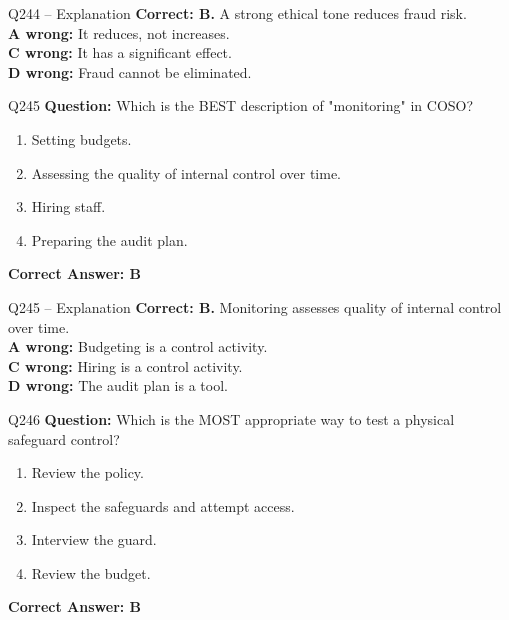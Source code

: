 \documentclass[aspectratio=169,10pt]{beamer}
\begin{document}
	\begin{frame}[t]{Q244 -- Explanation}
		\small
		\textbf{Correct: B.} A strong ethical tone reduces fraud risk. \\[4pt]
		\textbf{A wrong:} It reduces, not increases. \\[2pt]
		\textbf{C wrong:} It has a significant effect. \\[2pt]
		\textbf{D wrong:} Fraud cannot be eliminated.
	\end{frame}
	
	\begin{frame}[t]{Q245}
		\small
		\textbf{Question:} Which is the BEST description of "monitoring" in COSO?
		\begin{enumerate}[label=\Alph*.,itemsep=1pt,topsep=2pt]
			\item Setting budgets.
			\item Assessing the quality of internal control over time.
			\item Hiring staff.
			\item Preparing the audit plan.
		\end{enumerate}
		\vspace{4pt}
		\textbf{Correct Answer: B}
	\end{frame}
	
	\begin{frame}[t]{Q245 -- Explanation}
		\small
		\textbf{Correct: B.} Monitoring assesses quality of internal control over time. \\[4pt]
		\textbf{A wrong:} Budgeting is a control activity. \\[2pt]
		\textbf{C wrong:} Hiring is a control activity. \\[2pt]
		\textbf{D wrong:} The audit plan is a tool.
	\end{frame}
	
	\begin{frame}[t]{Q246}
		\small
		\textbf{Question:} Which is the MOST appropriate way to test a physical safeguard control?
		\begin{enumerate}[label=\Alph*.,itemsep=1pt,topsep=2pt]
			\item Review the policy.
			\item Inspect the safeguards and attempt access.
			\item Interview the guard.
			\item Review the budget.
		\end{enumerate}
		\vspace{4pt}
		\textbf{Correct Answer: B}
	\end{frame}
	
\end{document}
